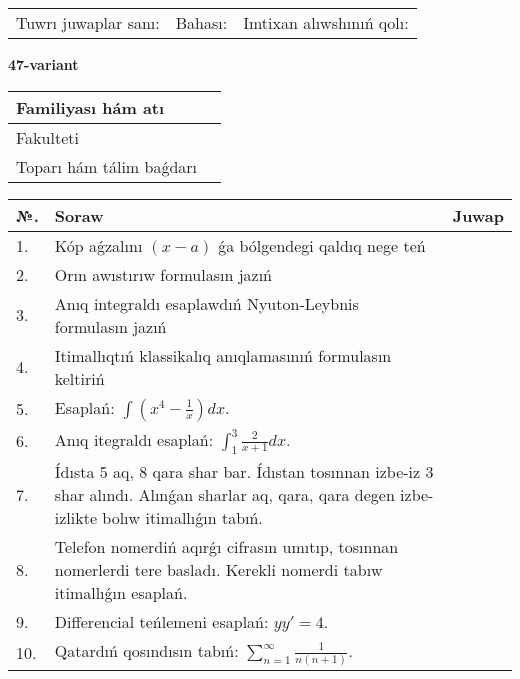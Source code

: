 \documentclass{article}
\begin{document}
\vspace{1cm}

\begin{tabular}{ c c c }
Tuwrı juwaplar sanı: \underline{\hspace{2cm}} & Bahası: \underline{\hspace{2cm}} & Imtixan alıwshınıń qolı: \underline{\hspace{2cm}} \\
\end{tabular}

\newpage

\begin{center}\textbf{47-variant}\end{center}

\bgroup
\def\arraystretch{1.5}
\begin{tabular}{ |m{6cm}|m{10cm}| }
  \hline
  Familiyası hám atı & \\
  \hline
  Fakulteti &\\
  \hline
  Toparı hám tálim baǵdarı & \\
  \hline
\end{tabular}
\egroup

\vspace{0.5cm}

\bgroup
\def\arraystretch{2}
\begin{tabular}{ |l|m{8cm}|m{7cm}| }
  \hline
  №. & Soraw & Juwap \\
  \hline
  1. & Kóp aǵzalını $(x - a)$ ǵa bólgendegi qaldıq nege teń &  \\
  \hline
  2. & Orın awıstırıw formulasın jazıń &  \\
  \hline
  3. & Anıq integraldı esaplawdıń Nyuton-Leybnis formulasın jazıń &  \\
  \hline
  4. & Itimallıqtıń klassikalıq anıqlamasınıń formulasın keltiriń &  \\
  \hline
  5. & Esaplań: $\displaystyle\int \left( x^{4}-\frac{1}{x} \right)dx$. &  \\
  \hline
  6. & Anıq itegraldı esaplań: $\displaystyle\int_{1}^{3}{\frac{2}{x + 1}dx}$. &  \\
  \hline
  7. & Ídısta 5 aq, 8 qara shar bar. Ídıstan tosınnan izbe-iz 3 shar alındı. Alınǵan sharlar aq, qara, qara degen izbe-izlikte bolıw itimallıǵın tabıń. &  \\
  \hline
  8. & Telefon nomerdiń aqırǵı cifrasın umıtıp, tosınnan nomerlerdi tere basladı. Kerekli nomerdi tabıw itimallıǵın esaplań. &  \\
  \hline
  9. & Differencial teńlemeni esaplań: $yy'= 4$. &  \\
  \hline
  10. & Qatardıń qosındısın tabıń: $\displaystyle\sum_{n = 1}^{\infty}\frac{1}{n(n + 1)}$. &  \\
  \hline
\end{tabular}
\egroup
\end{document}
